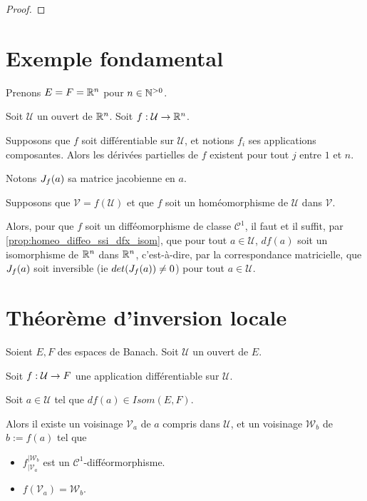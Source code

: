 \ifdefined\outputproof
\begin{proof}

\end{proof}
\fi

\section{Exemple fondamental}

Prenons $E = F = \mathbb{R}^{n}$ pour $n \in \mathbb{N}^{> 0}$.

Soit $\mathcal{U}$ un ouvert de $\mathbb{R}^{n}$.
Soit $f : \mathcal{U} \rightarrow \mathbb{R}^{n}$.

Supposons que $f$ soit différentiable sur $\mathcal{U}$, et notions $f_{i}$ ses
applications composantes. Alors les dérivées partielles de $f$ existent pour
tout $j$ entre $1$ et $n$.

Notons $J_{f}(a)$ sa matrice jacobienne en $a$.

Supposons que $\mathcal{V} = f(\mathcal{U})$ et que $f$ soit un homéomorphisme
de $\mathcal{U}$ dans $\mathcal{V}$.

Alors, pour que $f$ soit un difféomorphisme de classe $\mathcal{C}^{1}$, il faut
et il suffit, par \ref{prop:homeo_diffeo_ssi_dfx_isom}, que pour tout $a \in
\mathcal{U}$, $df(a)$ soit un isomorphisme de $\mathbb{R}^{n}$ dans $\mathbb{R}^{n}$,
c'est-à-dire, par la correspondance matricielle, que $J_{f}(a)$
soit inversible (ie $det(J_{f}(a)) \neq 0$) pour tout $a \in
\mathcal{U}$.

\section{Théorème d'inversion locale}

\begin{theorem} 
	\label{theorem:local_inversion}
	Soient $E, F$ des espaces de Banach.
	Soit $\mathcal{U}$ un ouvert de $E$.

	Soit $f : \mathcal{U} \rightarrow F$ une application différentiable sur
	$\mathcal{U}$.

	Soit $a \in \mathcal{U}$ tel que $df(a) \in Isom(E, F)$.

	Alors il existe un voisinage $\mathcal{V}_{a}$ de $a$ compris dans
	$\mathcal{U}$, et un voisinage $\mathcal{W}_{b}$ de $b := f(a)$ tel que

	\begin{itemize}
		\item $f^{|\mathcal{W}_{b}}_{|\mathcal{V}_{a}}$ est un $\mathcal{C}^{1}$-difféormorphisme.
		\item $f(\mathcal{V}_{a}) = \mathcal{W}_{b}$.
	\end{itemize}
\end{theorem}

